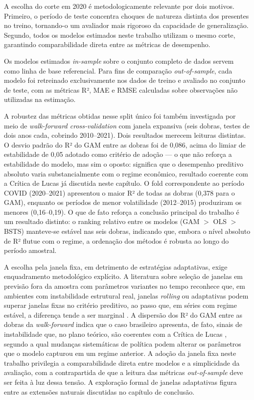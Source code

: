 \documentclass[	12pt, Times, openright, oneside, a4paper, english, brazil]{abntex2}
\begin{document}
A escolha do corte em 2020 é metodologicamente relevante por dois motivos. Primeiro, o período de teste concentra choques de natureza distinta dos presentes no treino, tornando-o um avaliador mais rigoroso da capacidade de generalização. Segundo, todos os modelos estimados neste trabalho utilizam o mesmo corte, garantindo comparabilidade direta entre as métricas de desempenho.

Os modelos estimados \textit{in-sample} sobre o conjunto completo de dados servem como linha de base referencial. Para fins de comparação \textit{out-of-sample}, cada modelo foi retreinado exclusivamente nos dados de treino e avaliado no conjunto de teste, com as métricas R², MAE e RMSE calculadas sobre observações não utilizadas na estimação.

A robustez das métricas obtidas nesse split único foi também investigada por meio de \textit{walk-forward cross-validation} com janela expansiva (seis dobras, testes de dois anos cada, cobrindo 2010--2021). Dois resultados merecem leituras distintas. O desvio padrão do R² do GAM entre as dobras foi de 0{,}086, acima do limiar de estabilidade de 0{,}05 adotado como critério de adoção — o que não reforça a estabilidade do modelo, mas sim o oposto: significa que o desempenho preditivo absoluto varia substancialmente com o regime econômico, resultado coerente com a Crítica de Lucas já discutida neste capítulo. O fold correspondente ao período COVID (2020--2021) apresentou o maior R² de todas as dobras (0{,}378 para o GAM), enquanto os períodos de menor volatilidade (2012--2015) produziram os menores (0{,}16--0{,}19). O que de fato reforça a conclusão principal do trabalho é um resultado distinto: o ranking relativo entre os modelos (GAM $>$ OLS $>$ BSTS) manteve-se estável nas seis dobras, indicando que, embora o nível absoluto de R² flutue com o regime, a ordenação dos métodos é robusta ao longo do período amostral.

A escolha pela janela fixa, em detrimento de estratégias adaptativas, exige enquadramento metodológico explícito. A literatura sobre seleção de janelas em previsão fora da amostra com parâmetros variantes no tempo reconhece que, em ambientes com instabilidade estrutural real, janelas \textit{rolling} ou adaptativas podem superar janelas fixas no critério preditivo, ao passo que, em séries com regime estável, a diferença tende a ser marginal \cite{inoue2017rolling}. A dispersão dos R² do GAM entre as dobras da \textit{walk-forward} indica que o caso brasileiro apresenta, de fato, sinais de instabilidade que, no plano teórico, são coerentes com a Crítica de Lucas \cite{lucas1976critique}, segundo a qual mudanças sistemáticas de política podem alterar os parâmetros que o modelo capturou em um regime anterior. A adoção da janela fixa neste trabalho privilegia a comparabilidade direta entre modelos e a simplicidade da avaliação, com a contrapartida de que a leitura das métricas \textit{out-of-sample} deve ser feita à luz dessa tensão. A exploração formal de janelas adaptativas figura entre as extensões naturais discutidas no capítulo de conclusão.
\end{document}
